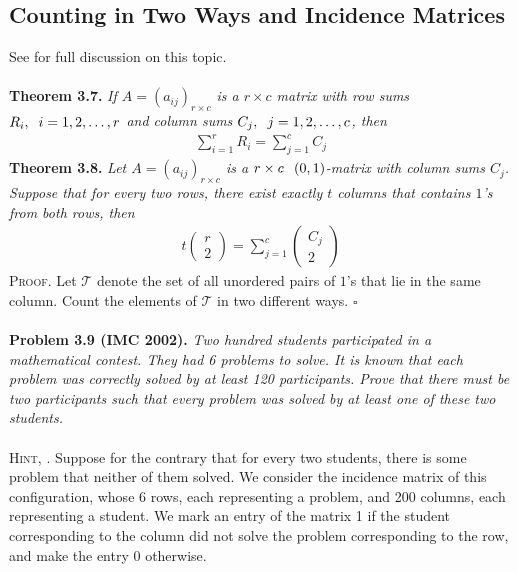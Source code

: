 \documentclass[a4paper,oneside]{article}
\numberwithin{equation}{section}
\begin{document}
\subsection{Counting in Two Ways and Incidence Matrices}
See \cite{5} for full discussion on this topic.\\
\\
\textbf{Theorem 3.7.} \textit{If $A = {\left( {{a_{ij}}} \right)_{r \times c}}$ is a $r \times c$ matrix with row sums $R_i,\hspace{0.2cm} i=1,2,\ldots,r$ and column sums $C_j,\hspace{0.2cm}j=1,2,\ldots,c$, then}
\begin{align}
\sum\limits_{i = 1}^r {{R_i}}  = \sum\limits_{j = 1}^c {{C_j}} 
\end{align}
\textbf{Theorem 3.8.} \textit{Let $A = {\left( {{a_{ij}}} \right)_{r \times c}}$ is a $r \times c \hspace{0.2cm} \left(0,1\right)$-matrix with column sums $C_j$. Suppose that for every two rows, there exist exactly $t$ columns that contains $1$'s from both rows, then}
\begin{align}
t\left( {\begin{array}{*{20}{c}}
r\\
2
\end{array}} \right) = \sum\limits_{j = 1}^c {\left( {\begin{array}{*{20}{c}}
{{C_j}}\\
2
\end{array}} \right)}
\end{align}
\textsc{Proof.} Let $\mathcal{T}$ denote the set of all  unordered pairs of $1$'s that lie in the same column. Count the elements of $\mathcal{T}$ in two different ways. \hfill $\square$\\
\\
\textbf{Problem 3.9 (IMC 2002).} \textit{Two hundred  students participated in a mathematical contest. They had 6 problems to solve. It is known that each problem was correctly solved by at least 120 participants. Prove that there must be two participants such that every problem was solved by at least one of these two students.}\\
\\
\textsc{Hint, \cite{5}.} Suppose for the contrary that for every two students, there is some problem that neither of them solved. We consider the incidence matrix of this configuration, whose 6 rows, each representing a problem, and 200 columns, each representing a student. We mark an entry of the matrix 1 if the student corresponding to the column did not solve the problem corresponding to the row, and make the entry 0 otherwise. 
\end{document}
